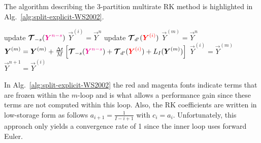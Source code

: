 \documentclass{report}
\numberwithin{equation}{section}
\begin{document}
The algorithm describing the 3-partition multirate RK method is highlighted in Alg.\ \ref{alg:split-explicit-WS2002}.
\begin{algorithm}
\label{alg:split-explicit-WS2002}
\begin{algorithmic}
\State
{}
\State update $\boldsymbol{{\mathcal{T}}}_{-s}(\textcolor{magenta}{ \boldsymbol{{Y}}^{n-s}})$
\State $\vec{Y}^{(i)}=\vec{Y}^n$ 
\State update $\boldsymbol{{\mathcal{T}}}_{d'}(\textcolor{red}{ \boldsymbol{{Y}}^{(i)} })$
\State $\vec{Y}^{(m)}=\vec{Y}^{n}$ 
\State $\boldsymbol{{Y}}^{(m)}=\boldsymbol{{Y}}^{(m)} + \frac{\Delta t}{M} \left[ \boldsymbol{{\mathcal{T}}}_{-s}(\textcolor{magenta}{ \boldsymbol{{Y}}^{n-s} }) + \boldsymbol{{\mathcal{T}}}_{d'}(\textcolor{red}{ \boldsymbol{{Y}}^{(i)}}) + L_I(\boldsymbol{{Y}}^{(m)}) \right]$
\EndFor %
\State $\vec{Y}^{(i)}=\vec{Y}^{(m)}$
\EndFor %
\State $\vec{Y}^{n+1}=\vec{Y}^{(i)}$
\EndFunction
\end{algorithmic}
\end{algorithm}
In Alg.\ \ref{alg:split-explicit-WS2002} the red and magenta fonts indicate terms that are frozen within the $m$-loop and is what allows a performance gain since these terms are not computed within this loop. Also, 
the RK coefficients are written in low-storage form as follows $a_{i+1}=\frac{1}{I-i+1}$ with $c_i=a_i$. Unfortunately, this approach only yields a convergence rate of 1 since the inner loop uses forward Euler.
\end{document}

